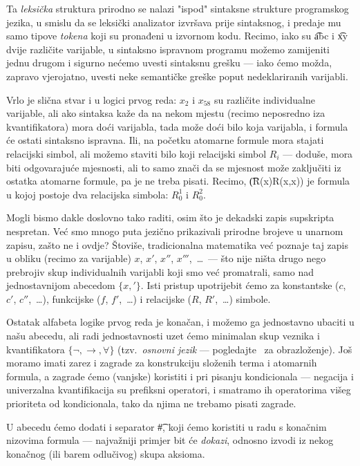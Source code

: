 Ta \emph{leksička} struktura prirodno se nalazi "ispod" sintaksne strukture programskog jezika, u smislu da se leksički analizator izvršava prije sintaksnog, i predaje mu samo tipove \emph{tokena} koji su pronađeni u izvornom kodu. Recimo, iako su \t{abc} i \t{xy} dvije različite varijable, u sintaksno ispravnom programu možemo zamijeniti jednu drugom i sigurno nećemo uvesti sintaksnu grešku --- iako ćemo možda, zapravo vjerojatno, uvesti neke semantičke greške poput nedeklariranih varijabli.

Vrlo je slična stvar i u logici prvog reda: $x_2$ i $x_{58}$ su različite individualne varijable, ali ako sintaksa kaže da na nekom mjestu (recimo neposredno iza kvantifikatora) mora doći varijabla, tada može doći bilo koja varijabla, i formula će ostati sintaksno ispravna. Ili, na početku atomarne formule mora stajati relacijski simbol, ali možemo staviti bilo koji relacijski simbol $R_i$ --- doduše, mora biti odgovarajuće mjesnosti, ali to samo znači da se mjesnost može zaključiti iz ostatka atomarne formule, pa je ne treba pisati. Recimo, \t{(R(x)\textrightarrow R(x,x))} je formula u kojoj postoje dva relacijska simbola: $R_0^1$ i $R_0^2$.

Mogli bismo dakle doslovno tako raditi, osim što je dekadski zapis supskripta nespretan. Već smo mnogo puta jezično prikazivali prirodne brojeve u unarnom zapisu, zašto ne i ovdje? Štoviše, tradicionalna matematika već poznaje taj zapis u obliku (recimo za varijable) $x$, $x'$, $x''$, $x'''$,~\ldots\ --- što nije ništa drugo nego prebrojiv skup individualnih varijabli koji smo već promatrali, samo nad jednostavnijom abecedom $\{x,'\!\}$. Isti pristup upotrijebit ćemo za konstantske ($c$, $c'$, $c''$,~\ldots), funkcijske ($f$, $f'$,~\ldots) i relacijske ($R$, $R'$,~\ldots) simbole.

Ostatak alfabeta logike prvog reda je konačan, i možemo ga jednostavno ubaciti u našu abecedu, ali radi jednostavnosti uzet ćemo minimalan skup veznika i kvantifikatora $\{\lnot,\to,\forall\}$ (tzv.\ \emph{osnovni jezik} --- pogledajte~\cite{skr:VukML} za obrazloženje). Još moramo imati zarez i zagrade za konstrukciju složenih terma i atomarnih formula, a zagrade ćemo (vanjske) koristiti i pri pisanju kondicionala --- negacija i univerzalna kvantifikacija su prefiksni operatori, i smatramo ih operatorima višeg prioriteta od kondicionala, tako da njima ne trebamo pisati zagrade.

U abecedu ćemo dodati i separator \t\#, koji ćemo koristiti u radu s konačnim nizovima formula --- najvažniji primjer bit će \emph{dokazi}, odnosno izvodi iz nekog konačnog (ili barem odlučivog) skupa aksioma.

